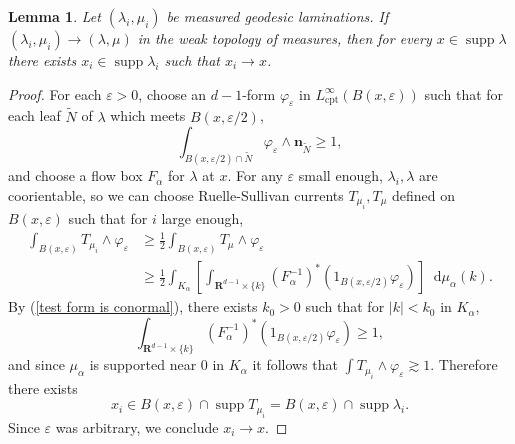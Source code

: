 \documentclass[reqno,10pt]{amsart}
\newcommand{\RR}{\mathbf{R}}
\newcommand*\dif{\mathop{}\!\mathrm{d}}
\DeclareMathOperator{\supp}{supp}
\newcommand{\normal}{\mathbf n}
\newcommand{\cpt}{\mathrm{cpt}}
\newtheorem{lemma}[theorem]{Lemma}
\theoremstyle{definition}
\numberwithin{equation}{section}
\begin{document}
\begin{lemma}
Let $(\lambda_i, \mu_i)$ be measured geodesic laminations.
If $(\lambda_i, \mu_i) \to (\lambda, \mu)$ in the weak topology of measures, then for every $x \in \supp \lambda$ there exists $x_i \in \supp \lambda_i$ such that $x_i \to x$.
\end{lemma}
\begin{proof}
For each $\varepsilon > 0$, choose an $d-1$-form $\varphi_\varepsilon$ in $L^\infty_\cpt(B(x, \varepsilon))$ such that for each leaf $\tilde N$ of $\lambda$ which meets $B(x, \varepsilon/2)$,
\begin{equation}\label{test form is conormal}
\int_{B(x, \varepsilon/2) \cap \tilde N} \varphi_\varepsilon \wedge \normal_{\tilde N} \geq 1,
\end{equation}
and choose a flow box $F_\alpha$ for $\lambda$ at $x$.
For any $\varepsilon$ small enough, $\lambda_i, \lambda$ are coorientable, so we can choose Ruelle-Sullivan currents $T_{\mu_i}, T_\mu$ defined on $B(x, \varepsilon)$ such that for $i$ large enough, 
\begin{align*}
\int_{B(x, \varepsilon)} T_{\mu_i} \wedge \varphi_\varepsilon
&\geq \frac{1}{2} \int_{B(x, \varepsilon)} T_\mu \wedge \varphi_\varepsilon\\
&\geq \frac{1}{2} \int_{K_\alpha} \left[\int_{\RR^{d - 1} \times \{k\}} (F_\alpha^{-1})^* (1_{B(x, \varepsilon/2)} \varphi_\varepsilon)\right] \dif \mu_\alpha(k).
\end{align*}
By (\ref{test form is conormal}), there exists $k_0 > 0$ such that for $|k| < k_0$ in $K_\alpha$,
$$\int_{\RR^{d - 1} \times \{k\}} (F_\alpha^{-1})^* (1_{B(x, \varepsilon/2)} \varphi_\varepsilon) \geq 1,$$
and since $\mu_\alpha$ is supported near $0$ in $K_\alpha$ it follows that $\int T_{\mu_i} \wedge \varphi_\varepsilon \gtrsim 1$.
Therefore there exists
$$x_i \in B(x, \varepsilon) \cap \supp T_{\mu_i} = B(x, \varepsilon) \cap \supp \lambda_i.$$
Since $\varepsilon$ was arbitrary, we conclude $x_i \to x$.
\end{proof}
\end{document}

